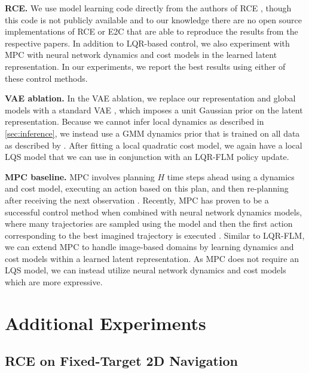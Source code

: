 {\bf RCE.} We use model learning code directly from the authors of RCE \citep{rce}, though this code is not publicly available and to our knowledge there are no open source implementations of RCE or E2C \citep{e2c} that are able to reproduce the results from the respective papers. In addition to LQR-based control, we also experiment with MPC with neural network dynamics and cost models in the learned latent representation. In our experiments, we report the best results using either of these control methods.

{\bf VAE ablation.} In the VAE ablation, we replace our representation and global models with a standard VAE \citep{Kingma2013, Rezende2014}, which imposes a unit Gaussian prior on the latent representation. Because we cannot infer local dynamics as described in \autoref{sec:inference}, we instead use a GMM dynamics prior that is trained on all data as described by \citet{gps}. After fitting a local quadratic cost model, we again have a local LQS model that we can use in conjunction with an LQR-FLM policy update.

{\bf MPC baseline.} MPC involves planning $H$ time steps ahead using a dynamics and cost model, executing an action based on this plan, and then re-planning after receiving the next observation \citep{mpc}. Recently, MPC has proven to be a successful control method when combined with neural network dynamics models, where many trajectories are sampled using the model and then the first action corresponding to the best imagined trajectory is executed \citep{nn-dyn,pets}. Similar to LQR-FLM, we can extend MPC to handle image-based domains by learning dynamics and cost models within a learned latent representation. As MPC does not require an LQS model, we can instead utilize neural network dynamics and cost models which are more expressive.


\section{Additional Experiments}
\label{sec:supp-exp}

\subsection{RCE on Fixed-Target 2D Navigation}

